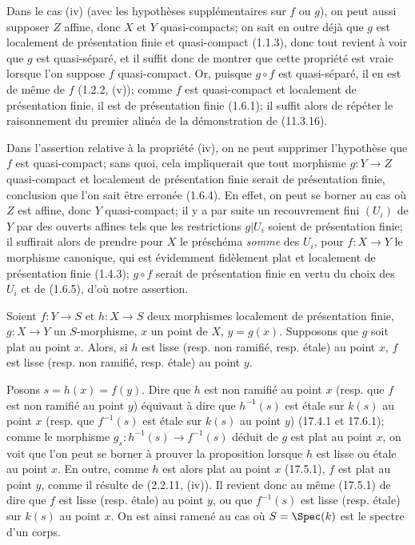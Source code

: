 Dans le cas (iv) (avec les hypothèses supplémentaires sur $f$ ou $g$), on peut aussi supposer $Z$ affine, donc $X$ et $Y$ quasi-compacts; on sait en outre déjà que $g$ est localement de présentation finie et quasi-compact (1.1.3), donc tout revient à voir que $g$ est quasi-séparé, et il suffit donc de montrer que cette propriété est vraie lorsque l'on suppose $f$ quasi-compact. Or, puisque $g\circ f$ est quasi-séparé, il en est de même de $f$ (1.2.2, (v)); comme $f$ est quasi-compact et localement de présentation finie, il est de présentation finie (1.6.1); il suffit alors de répéter le raisonnement du premier alinéa de la démonstration de (11.3.16).

\begin{remark}[17.7.6]
\label{IV.17.7.6}
Dans l'assertion relative à la propriété (iv), on ne peut supprimer l'hypothèse que $f$ est quasi-compact; sans quoi, cela impliquerait que tout morphisme $g:Y\to Z$ quasi-compact et localement de présentation finie serait de présentation finie, conclusion que l'on sait être erronée (1.6.4). En effet, on peut se borner au cas où $Z$ est affine, donc $Y$ quasi-compact; il y a par suite un recouvrement fini $(U_i)$ de $Y$ par des ouverts affines tels que les restrictions $g|U_i$ soient de présentation finie; il suffirait alors de prendre pour $X$ le préschéma \emph{somme} des $U_i$, pour $f:X\to Y$ le morphisme canonique, qui est évidemment fidèlement plat et localement de présentation finie (1.4.3); $g\circ f$ serait de présentation finie en vertu du choix des $U_i$ et de (1.6.5), d'où notre assertion.
\end{remark}

\begin{proposition}[17.7.7]
\label{IV.17.7.7}
Soient $f:Y\to S$ et $h:X\to S$ deux morphismes localement de présentation finie, $g:X\to Y$ un $S$-morphisme, $x$ un point de $X$, $y=g(x)$. Supposons que $g$ soit plat au point $x$. Alors, si $h$ est lisse (resp. non ramifié, resp. étale) au point $x$, $f$ est lisse (resp. non ramifié, resp. étale) au point $y$.
\end{proposition}

Posons $s=h(x)=f(y)$. Dire que $h$ est non ramifié au point $x$ (resp. que $f$ est non ramifié au point $y$) équivaut à dire que $h^{-1}(s)$ est étale sur $k(s)$ au point $x$ (resp. que $f^{-1}(s)$ est étale sur $k(s)$ au point $y$) (17.4.1 et 17.6.1); comme le morphisme $g_s:h^{-1}(s)\to f^{-1}(s)$ déduit de $g$ est plat au point $x$, on voit que l'on peut se borner à prouver la proposition lorsque $h$ est lisse ou étale au point $x$. En outre, comme $h$ est alors plat au point $x$ (17.5.1), $f$ est plat au point $y$, comme il résulte de (2.2.11, (iv)). Il revient donc au même (17.5.1) de dire que $f$ est lisse (resp. étale) au point $y$, ou que $f^{-1}(s)$ est lisse (resp. étale) sur $k(s)$ au point $x$. On est ainsi ramené au cas où $S=\Spec(k)$ est le spectre d'un corps.


